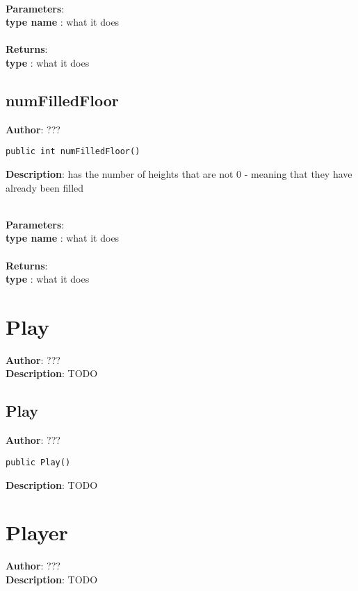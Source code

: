 \documentclass[12pt]{article}
\begin{document}
\textbf{\large{\\Parameters}}:\\
\textbf{type name }: what it does\\\textbf{\large{\\Returns}}:\\\textbf{type }: what it does

\subsection{numFilledFloor}
\textbf{Author}: ??? 
\vspace*{1\baselineskip}
\begin{lstlisting}
public int numFilledFloor()
\end{lstlisting} 
\vspace*{1\baselineskip}
\textbf{Description}: has the number of heights that are not 0 - meaning that they have already been filled 


\textbf{\large{\\Parameters}}:\\
\textbf{type name }: what it does\\\textbf{\large{\\Returns}}:\\\textbf{type }: what it does

\section{Play}
\textbf{Author}: ??? \\
\textbf{Description}: TODO \\



\subsection{Play}
\textbf{Author}: ??? 
\vspace*{1\baselineskip}
\begin{lstlisting}
public Play()
\end{lstlisting} 
\vspace*{1\baselineskip}
\textbf{Description}: TODO 



\section{Player}
\textbf{Author}: ??? \\
\textbf{Description}: TODO \\
\end{document}
